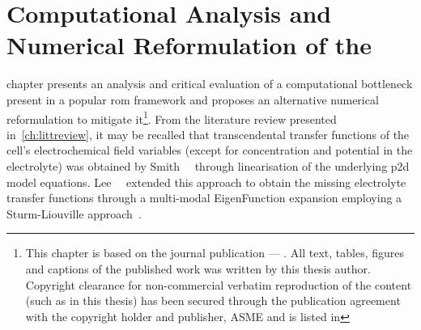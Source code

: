 
\chapter{Computational Analysis and Numerical Reformulation of the }\label{ch:improveddra}
\startcontents[chapters]

\bigskip

 chapter presents  an analysis and critical  evaluation of a
computational bottleneck present  in a popular \gls{rom}  framework and proposes
an alternative  numerical reformulation to mitigate  it\footnote{This chapter is
based on  the journal  publication --- . All text,
tables, figures and captions of the published work was written by this thesis
author. Copyright clearance for non-commercial verbatim reproduction of the
content (such as in this thesis) has been secured
through the publication agreement  with the copyright holder and publisher, ASME and is listed in}.  From the
literature  review presented  in~\cref{ch:littreview}, it  may be  recalled that
transcendental transfer functions of  the cell's electrochemical field variables
(except  for concentration  and potential  in the  electrolyte) was  obtained by
Smith~\etal~\cite{Smith2007} through  linearisation of the  underlying \gls{p2d}
model  equations. Lee~\etal~\cite{Lee2012a,Lee2012}  extended  this approach  to
obtain  the  missing  electrolyte   transfer  functions  through  a  multi-modal
EigenFunction expansion employing a Sturm-Liouville approach~\cite{Pryce1993}.


